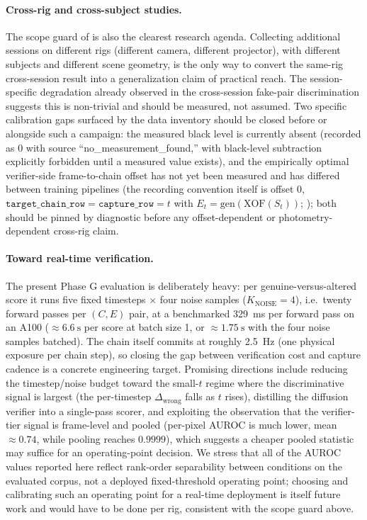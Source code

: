 \paragraph{Cross-rig and cross-subject studies.} The scope guard of  is also the clearest research agenda. Collecting additional sessions on different rigs (different camera, different projector), with different subjects and different scene geometry, is the only way to convert the same-rig cross-session result into a generalization claim of practical reach. The session-specific degradation already observed in the cross-session fake-pair discrimination suggests this is non-trivial and should be measured, not assumed. Two specific calibration gaps surfaced by the data inventory should be closed before or alongside such a campaign: the measured black level is currently absent (recorded as $0$ with source ``no\_measurement\_found,'' with black-level subtraction explicitly forbidden until a measured value exists), and the empirically optimal verifier-side frame-to-chain offset has not yet been measured and has differed between training pipelines (the recording convention itself is offset $0$, $\texttt{target\_chain\_row} = \texttt{capture\_row} = t$ with $E_t = \mathrm{gen}(\mathrm{XOF}(S_t))$; ); both should be pinned by diagnostic before any offset-dependent or photometry-dependent cross-rig claim.

\paragraph{Toward real-time verification.} The present Phase G evaluation is deliberately heavy: per genuine-versus-altered score it runs five fixed timesteps $\times$ four noise samples ($K_\text{NOISE}=4$), i.e.\ twenty forward passes per $(C,E)$ pair, at a benchmarked \SI{329}{\milli\second} per forward pass on an A100 ($\approx \SI{6.6}{\second}$ per score at batch size 1, or $\approx \SI{1.75}{\second}$ with the four noise samples batched). The chain itself commits at roughly \SI{2.5}{\hertz} (one physical exposure per chain step), so closing the gap between verification cost and capture cadence is a concrete engineering target. Promising directions include reducing the timestep/noise budget toward the small-$t$ regime where the discriminative signal is largest (the per-timestep $\Delta_\text{wrong}$ falls as $t$ rises), distilling the diffusion verifier into a single-pass scorer, and exploiting the observation that the verifier-tier signal is frame-level and pooled (per-pixel AUROC is much lower, mean $\approx 0.74$, while pooling reaches $0.9999$), which suggests a cheaper pooled statistic may suffice for an operating-point decision. We stress that all of the AUROC values reported here reflect rank-order separability between conditions on the evaluated corpus, not a deployed fixed-threshold operating point; choosing and calibrating such an operating point for a real-time deployment is itself future work and would have to be done per rig, consistent with the scope guard above.
